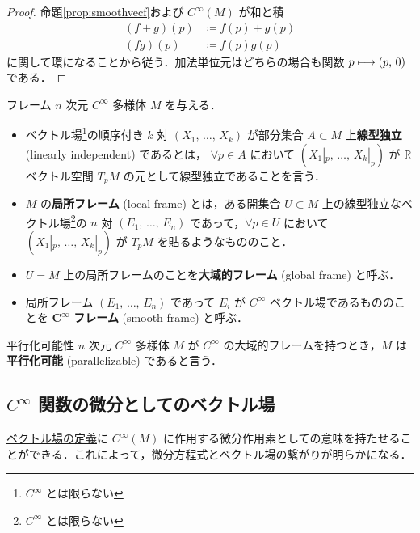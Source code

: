 \documentclass[TQFT_main]{subfiles}
\begin{document}
\begin{proof}
    命題\ref{prop:smoothvecf}および $C^\infty(M)$ が和と積
    \begin{align}
        (f + g)(p) &\coloneqq f(p) + g(p) \\
        (fg)(p) &\coloneqq f(p) g(p)
    \end{align}
    に関して環になることから従う．加法単位元はどちらの場合も関数 $p \longmapsto (p,\, 0)$ である．
\end{proof}

\begin{mydef}[label=def:smoothframe]{フレーム}
    $n$ 次元 $C^\infty$ 多様体 $M$ を与える．
    \begin{itemize}
        \item ベクトル場\footnote{$C^\infty$ とは限らない}の順序付き $k$ 対 $(X_1,\, \dots,\, X_k)$ が部分集合 $A \subset M$ 上\textbf{線型独立} (linearly independent) であるとは， $\forall p \in A$ において $(X_1|_p,\, \dots,\, X_k|_p)$ が $\mathbb{R}$ ベクトル空間 $T_p M$ の元として線型独立であることを言う．
        \item $M$ の\textbf{局所フレーム} (local frame) とは，ある開集合 $U \subset M$ 上の線型独立なベクトル場\footnote{$C^\infty$ とは限らない}の $n$ 対 $(E_1,\, \dots,\, E_n)$ であって，$\forall p \in U$ において $(X_1|_p,\, \dots,\, X_k|_p)$ が $T_p M$ を貼るようなもののこと．
        \item $U = M$ 上の局所フレームのことを\textbf{大域的フレーム} (global frame) と呼ぶ．
        \item 局所フレーム  $(E_1,\, \dots,\, E_n)$ であって $E_i$ が $C^\infty$ ベクトル場であるもののことを $\bm{C^\infty}$ \textbf{フレーム} (smooth frame) と呼ぶ．
    \end{itemize}
\end{mydef}

\begin{mydef}[label=def:parallel]{平行化可能性}
    $n$ 次元 $C^\infty$ 多様体 $M$ が $C^\infty$ の大域的フレームを持つとき，$M$ は\textbf{平行化可能} (parallelizable) であると言う．
\end{mydef}


\subsection{$C^\infty$ 関数の微分としてのベクトル場}

\hyperref[def:vecf]{ベクトル場の定義}に $C^\infty (M)$ に作用する微分作用素としての意味を持たせることができる．これによって，微分方程式とベクトル場の繋がりが明らかになる．
\end{document}

